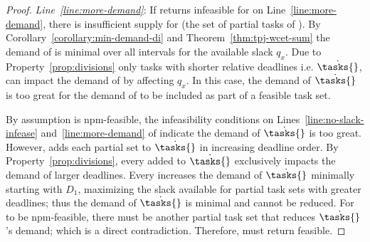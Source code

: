 \begin{theorem}
\begin{proof}
    \emph{Line~\ref{line:more-demand}}: If \tpj{} returns infeasible
    for \ants{} on Line~\ref{line:more-demand}, there is insufficient
    supply for  (the set of partial tasks of ). By
    Corollary~\ref{corollary:min-demand-di} and
    Theorem~\ref{thm:tpj-wcet-sum} the demand of  is
    minimal over all intervals for the available slack ${q_x}$. Due to
    Property~\ref{prop:divisions} only tasks with shorter relative
    deadlines i.e. ${\dot{\tasks{}}}$, can impact the demand of
     by affecting ${q_x}$. In this case, the demand of
    ${\dot{\tasks{}}}$ is too great for the demand of  to
    be included as part of a feasible task set.

    By assumption \ants{} is npm-feasible, the infeasibility
    conditions on Lines~\ref{line:no-slack-infease}
    and~\ref{line:more-demand} of \tpj{} indicate the demand of 
    ${\dot{\tasks{}}}$ is too great. However, \tpj{} adds each
    partial set  to ${\dot{\tasks{}}}$ in increasing
    deadline order. By Property~\ref{prop:divisions}, every 
     added to ${\dot{\tasks{}}}$ exclusively impacts the
    demand of larger deadlines. Every  increases the demand of
    ${\dot{\tasks{}}}$ minimally starting with ${D_1}$, maximizing the
    slack available for partial task sets with greater deadlines; thus
    the demand of ${\dot{\tasks{}}}$ is minimal and cannot be
    reduced. For \ants{} to be npm-feasible, there must be another
    partial task set that reduces ${\dot{\tasks{}}}$'s demand;
    which is
    a direct contradiction. Therefore, \tpj{} must return feasible.  
  \end{proof}
\end{theorem}

